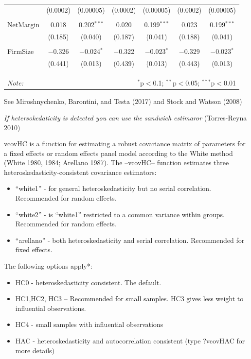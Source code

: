 \documentclass[12pt,]{article}
\providecommand{\tightlist}{%
  \setlength{\itemsep}{0pt}\setlength{\parskip}{0pt}}
\begin{document}
\begin{table}[h]
\begin{tabular}{@{\extracolsep{5pt}}lcccccc}
  & (0.0002) & (0.00005) & (0.0002) & (0.00005) & (0.0002) & (0.00005) \\ 
  & & & & & & \\ 
 NetMargin & 0.018 & 0.202$^{***}$ & 0.020 & 0.199$^{***}$ & 0.023 & 0.199$^{***}$ \\ 
  & (0.185) & (0.040) & (0.187) & (0.041) & (0.188) & (0.041) \\ 
  & & & & & & \\ 
 FirmSize & $-$0.326 & $-$0.024$^{*}$ & $-$0.322 & $-$0.023$^{*}$ & $-$0.329 & $-$0.023$^{*}$ \\ 
  & (0.441) & (0.013) & (0.439) & (0.013) & (0.443) & (0.013) \\ 
  & & & & & & \\ 
\hline \\[-1.8ex] 
\hline 
\hline \\[-1.8ex] 
\textit{Note:}  & \multicolumn{6}{r}{$^{*}$p$<$0.1; $^{**}$p$<$0.05; $^{***}$p$<$0.01} \\ 
\end{tabular} 
\end{table}

See Miroshnychenko, Barontini, and Testa (2017) and Stock and Watson
(2008)

\emph{If hetersokedaticity is detected you can use the sandwich
estimaror} (Torres-Reyna 2010)

vcovHC is a function for estimating a robust covariance matrix of
parameters for a fixed effects or random effects panel model according
to the White method (White 1980, 1984; Arellano 1987). The --vcovHC--
function estimates three heteroskedasticity-consistent covariance
estimators:

\begin{itemize}
\item
  ``white1'' - for general heteroskedasticity but no serial correlation.
  Recommended for random effects.
\item
  ``white2'' - is ``white1'' restricted to a common variance within
  groups. Recommended for random effects.
\item
  ``arellano'' - both heteroskedasticity and serial correlation.
  Recommended for fixed effects.
\end{itemize}

The following options apply*:

\begin{itemize}
\tightlist
\item
  HC0 - heteroskedasticity consistent. The default.
\item
  HC1,HC2, HC3 -- Recommended for small samples. HC3 gives less weight
  to influential observations.
\item
  HC4 - small samples with influential observations
\item
  HAC - heteroskedasticity and autocorrelation consistent (type ?vcovHAC
  for more details)
\end{itemize}
\end{document}
